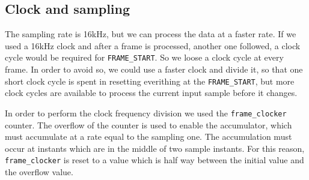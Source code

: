
\subsection{Clock and sampling}
The sampling rate is 16\si{\kilo\hertz}, but we can process the data at a faster
rate. If we used a 16\si{\kilo\hertz} clock and after a frame is processed,
another one followed, a clock cycle would be required for \texttt{FRAME\_START}.
So we loose a clock cycle at every frame. In order to avoid so, we could use a
faster clock and divide it, so that one short clock cycle is spent in resetting
everithing at the \texttt{FRAME\_START}, but more clock cycles are
available to process the current input sample before it changes.

In order to perform the clock frequency division we used the
\texttt{frame\_clocker} counter.
The overflow of the counter is used to enable the accumulator, which must
accumulate at a rate equal to the sampling one.
The accumulation must occur at instants which are in the middle of two sample
instants. For this reason, \texttt{frame\_clocker} is reset to a value which is
half way between the initial value and the overflow value.
